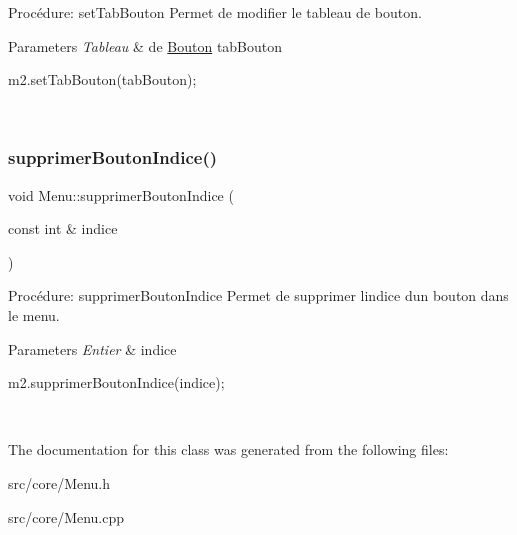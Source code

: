 Procédure\+: set\+Tab\+Bouton Permet de modifier le tableau de bouton. 


\begin{DoxyParams}{Parameters}
{\em Tableau} & de \hyperlink{classBouton}{Bouton} tab\+Bouton 
\begin{DoxyCode}
m2.setTabBouton(tabBouton);
\end{DoxyCode}
 \\
\hline
\end{DoxyParams}
\mbox{\label{classMenu_a1ed5172963be698f6fbabcf5a87ff664}} 
\subsubsection{\texorpdfstring{supprimer\+Bouton\+Indice()}{supprimerBoutonIndice()}}
{\footnotesize\ttfamily void Menu\+::supprimer\+Bouton\+Indice (\begin{DoxyParamCaption}\item[{const int \&}]{indice }\end{DoxyParamCaption})}



Procédure\+: supprimer\+Bouton\+Indice Permet de supprimer l\textquotesingle{}indice d\textquotesingle{}un bouton dans le menu. 


\begin{DoxyParams}{Parameters}
{\em Entier} & indice 
\begin{DoxyCode}
m2.supprimerBoutonIndice(indice);
\end{DoxyCode}
 \\
\hline
\end{DoxyParams}


The documentation for this class was generated from the following files\+:\begin{DoxyCompactItemize}
\item 
src/core/Menu.\+h\item 
src/core/Menu.\+cpp\end{DoxyCompactItemize}
